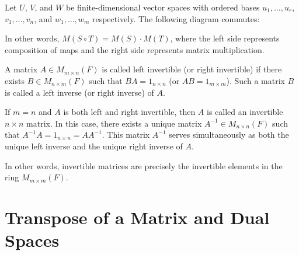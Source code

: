 \begin{theorem}
  Let $U$, $V$, and $W$ be finite-dimensional vector spaces with ordered bases $u_1,\ldots,u_r$, $v_1,\ldots,v_n$, and $w_1,\ldots,w_m$ respectively. The following diagram commutes:

  \begin{center}
  \end{center}

  In other words, $M(S \circ T) = M(S) \cdot M(T)$, where the left side represents composition of maps and the right side represents matrix multiplication.
\end{theorem}

\begin{definition}
  A matrix $A \in M_{m\times n}(F)$ is called left invertible (or right invertible) if there exists $B \in M_{n\times m}(F)$ such that $BA = 1_{n\times n}$ (or $AB = 1_{m\times m}$). Such a matrix $B$ is called a left inverse (or right inverse) of $A$.

  If $m = n$ and $A$ is both left and right invertible, then $A$ is called an invertible $n\times n$ matrix. In this case, there exists a unique matrix $A^{-1} \in M_{n\times n}(F)$ such that $A^{-1}A = 1_{n\times n} = AA^{-1}$. This matrix $A^{-1}$ serves simultaneously as both the unique left inverse and the unique right inverse of $A$.

  In other words, invertible matrices are precisely the invertible elements in the ring $M_{m\times m}(F)$.
\end{definition}

\section{Transpose of a Matrix and Dual Spaces}

